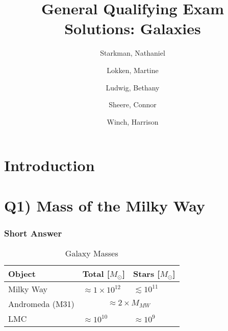 \documentclass[\main/main.tex]{subfiles}
\title{General Qualifying Exam Solutions: Galaxies\\}
\author{{Starkman}, Nathaniel \\%
		\and {Lokken}, Martine \\%
		\and {Ludwig}, Bethany \\%
		\and {Sheere}, Connor \\%
		\and {Winch}, Harrison%
}
\begin{document}

\maketitle


\tableofcontents
\let\tableofcontents\relax



\newpage
\section{Introduction} %
\label{sec:introduction}




\newpage



\section{Q1) Mass of the Milky Way} %
\label{sec:q1_mass_of_the_milky_way}


	\subsubsection{Short Answer} %
	\label{ssub:q1_short_answer}

		\begin{table}[H]
			\centering
			\caption{Galaxy Masses}
			\label{tab:my-table}
			\begin{tabular}{@{}l|ll@{}}
				\toprule
				Object          & Total {[}$M_\odot${]} & Stars {[}$M_\odot${]} \\ \midrule
				Milky Way       & $\approx 1 \times 10^{12}$     & $\lesssim 10^{11}$     \\
				Andromeda (M31) & \multicolumn{2}{c}{$\approx 2 \times M_{MW}$} \\
				LMC             & $\approx 10^{10} $    & $\approx 10^{9}$     \\ \bottomrule
			\end{tabular}
		\end{table}
\end{document}
